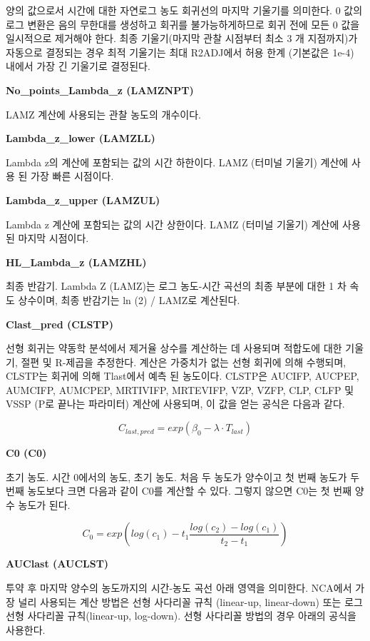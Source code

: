 \documentclass[
  11pt,
  krantz2, a4paper, twoside]{krantz}
\theoremstyle{definition}
\theoremstyle{definition}
\theoremstyle{definition}
\theoremstyle{definition}
\theoremstyle{remark}
\begin{document}
양의 값으로서 시간에 대한 자연로그 농도 회귀선의 마지막 기울기를 의미한다. 0 값의 로그 변환은 음의 무한대를 생성하고 회귀를 불가능하게하므로 회귀 전에 모든 0 값을 일시적으로 제거해야 한다. 최종 기울기(마지막 관찰 시점부터 최소 3 개 지점까지)가 자동으로 결정되는 경우 최적 기울기는 최대 R2ADJ에서 허용 한계 (기본값은 1e-4) 내에서 가장 긴 기울기로 결정된다.

\textbf{No\_points\_Lambda\_z (LAMZNPT)}

LAMZ 계산에 사용되는 관찰 농도의 개수이다.

\textbf{Lambda\_z\_lower (LAMZLL)}

Lambda z의 계산에 포함되는 값의 시간 하한이다. LAMZ (터미널 기울기) 계산에 사용 된 가장 빠른 시점이다.

\textbf{Lambda\_z\_upper (LAMZUL)}

Lambda z 계산에 포함되는 값의 시간 상한이다. LAMZ (터미널 기울기) 계산에 사용 된 마지막 시점이다.

\textbf{HL\_Lambda\_z (LAMZHL)}

최종 반감기. Lambda Z (LAMZ)는 로그 농도-시간 곡선의 최종 부분에 대한 1 차 속도 상수이며, 최종 반감기는 ln (2) / LAMZ로 계산된다.

\textbf{Clast\_pred (CLSTP)}

선형 회귀는 약동학 분석에서 제거율 상수를 계산하는 데 사용되며 적합도에 대한 기울기, 절편 및 R-제곱을 추정한다. 계산은 가중치가 없는 선형 회귀에 의해 수행되며, CLSTP는 회귀에 의해 Tlast에서 예측 된 농도이다. CLSTP은 AUCIFP, AUCPEP, AUMCIFP, AUMCPEP, MRTIVIFP, MRTEVIFP, VZP, VZFP, CLP, CLFP 및 VSSP (P로 끝나는 파라미터) 계산에 사용되며, 이 값을 얻는 공식은 다음과 같다.

\[ C_ {last, pred} = exp(\beta_{0}-\lambda\cdot T_{last}) \]

\textbf{C0 (C0)}

초기 농도. 시간 0에서의 농도, 초기 농도. 처음 두 농도가 양수이고 첫 번째 농도가 두 번째 농도보다 크면 다음과 같이 C0를 계산할 수 있다. 그렇지 않으면 C0는 첫 번째 양수 농도가 된다.

\[ C_ {0} = exp (log (c_ {1})-t_ {1} \frac {log (c_ {2})-log (c_ {1})} {t_ {2}-t_ {1} }) \]

\textbf{AUClast (AUCLST)}

투약 후 마지막 양수의 농도까지의 시간-농도 곡선 아래 영역을 의미한다. NCA에서 가장 널리 사용되는 계산 방법은 선형 사다리꼴 규칙 (linear-up, linear-down) 또는 로그 선형 사다리꼴 규칙(linear-up, log-down). 선형 사다리꼴 방법의 경우 아래의 공식을 사용한다.
\end{document}
